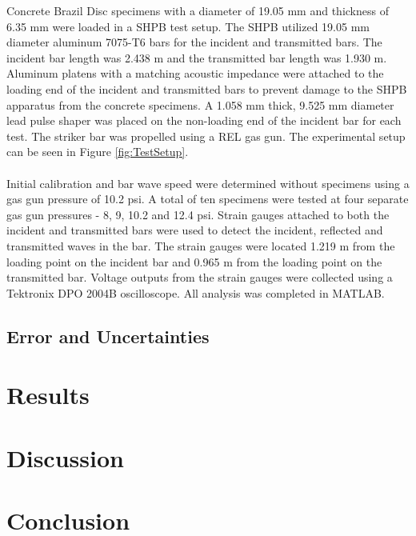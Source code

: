 \documentclass[12pt]{article}
\begin{document}
Concrete Brazil Disc specimens with a diameter of 19.05 mm and thickness of 6.35 mm were loaded in a SHPB test setup. The SHPB utilized 19.05 mm diameter aluminum 7075-T6 bars for the incident and transmitted bars. The incident bar length was 2.438 m and the transmitted bar length was 1.930 m. Aluminum platens with a matching acoustic impedance were attached to the loading end of the incident and transmitted bars to prevent damage to the SHPB apparatus from the concrete specimens. A 1.058 mm thick, 9.525 mm diameter lead pulse shaper was placed on the non-loading end of the incident bar for each test. The striker bar was propelled using a REL gas gun. The experimental setup can be seen in Figure \ref{fig:TestSetup}.
\\ \\
Initial calibration and bar wave speed were determined without specimens using a gas gun pressure of 10.2 psi. A total of ten specimens were tested at four separate gas gun pressures - 8, 9, 10.2 and 12.4 psi. Strain gauges attached to both the incident and transmitted bars were used to detect the incident, reflected and transmitted waves in the bar. The strain gauges were located 1.219 m from the loading point on the incident bar and 0.965 m from the loading point on the transmitted bar. Voltage outputs from the strain gauges were collected using a Tektronix DPO 2004B oscilloscope. All analysis was completed in MATLAB.   

\subsection{Error and Uncertainties} %

\section{Results} %

\section{Discussion} %

\section{Conclusion} %

\end{document}

